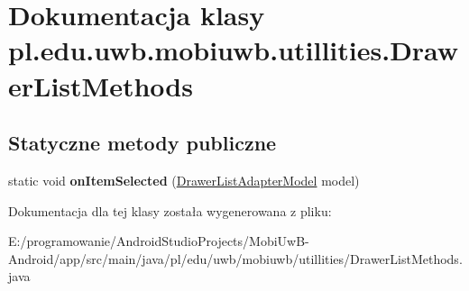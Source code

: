 \hypertarget{classpl_1_1edu_1_1uwb_1_1mobiuwb_1_1utillities_1_1_drawer_list_methods}{}\section{Dokumentacja klasy pl.\+edu.\+uwb.\+mobiuwb.\+utillities.\+Drawer\+List\+Methods}
\label{classpl_1_1edu_1_1uwb_1_1mobiuwb_1_1utillities_1_1_drawer_list_methods}
\subsection*{Statyczne metody publiczne}
\begin{DoxyCompactItemize}
\item 
\hypertarget{classpl_1_1edu_1_1uwb_1_1mobiuwb_1_1utillities_1_1_drawer_list_methods_a3231ddda7cdb3d30aeb1f84d23ee189c}{}static void {\bfseries on\+Item\+Selected} (\hyperlink{classpl_1_1edu_1_1uwb_1_1mobiuwb_1_1view_1_1model_1_1_drawer_list_adapter_model}{Drawer\+List\+Adapter\+Model} model)\label{classpl_1_1edu_1_1uwb_1_1mobiuwb_1_1utillities_1_1_drawer_list_methods_a3231ddda7cdb3d30aeb1f84d23ee189c}

\end{DoxyCompactItemize}


Dokumentacja dla tej klasy została wygenerowana z pliku\+:\begin{DoxyCompactItemize}
\item 
E\+:/programowanie/\+Android\+Studio\+Projects/\+Mobi\+Uw\+B-\/\+Android/app/src/main/java/pl/edu/uwb/mobiuwb/utillities/Drawer\+List\+Methods.\+java\end{DoxyCompactItemize}

